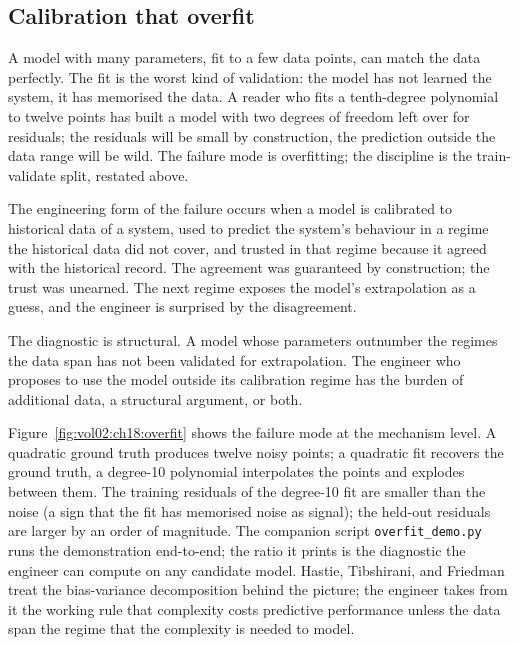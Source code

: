 \subsection{Calibration that overfit}

A model with many parameters, fit to a few data points, can
match the data perfectly. The fit is the worst kind of
validation: the model has not learned the system, it has
memorised the data. A reader who fits a tenth-degree polynomial
to twelve points has built a model with two degrees of freedom
left over for residuals; the residuals will be small by
construction, the prediction outside the data range will be
wild. The failure mode is overfitting; the discipline is the
train-validate split, restated above.

The engineering form of the failure occurs when a model is
calibrated to historical data of a system, used to predict the
system's behaviour in a regime the historical data did not
cover, and trusted in that regime because it agreed with the
historical record. The agreement was guaranteed by construction;
the trust was unearned. The next regime exposes the model's
extrapolation as a guess, and the engineer is surprised by the
disagreement.

The diagnostic is structural. A model whose parameters
outnumber the regimes the data span has not been validated for
extrapolation. The engineer who proposes to use the model
outside its calibration regime has the burden of additional
data, a structural argument, or both.



Figure~\ref{fig:vol02:ch18:overfit} shows the failure mode at the
mechanism level. A quadratic ground truth produces twelve noisy
points; a quadratic fit recovers the ground truth, a degree-10
polynomial interpolates the points and explodes between them. The
training residuals of the degree-10 fit are smaller than the noise
(a sign that the fit has memorised noise as signal); the held-out
residuals are larger by an order of magnitude. The companion script
\texttt{overfit\_demo.py} runs the demonstration end-to-end; the
ratio it prints is the diagnostic the engineer can compute on any
candidate model. Hastie, Tibshirani, and Friedman
\cite{text:v2ch18-hastie-statistical-learning-2009} treat the
bias-variance decomposition behind the picture; the engineer takes
from it the working rule that complexity costs predictive
performance unless the data span the regime that the complexity is
needed to model.

